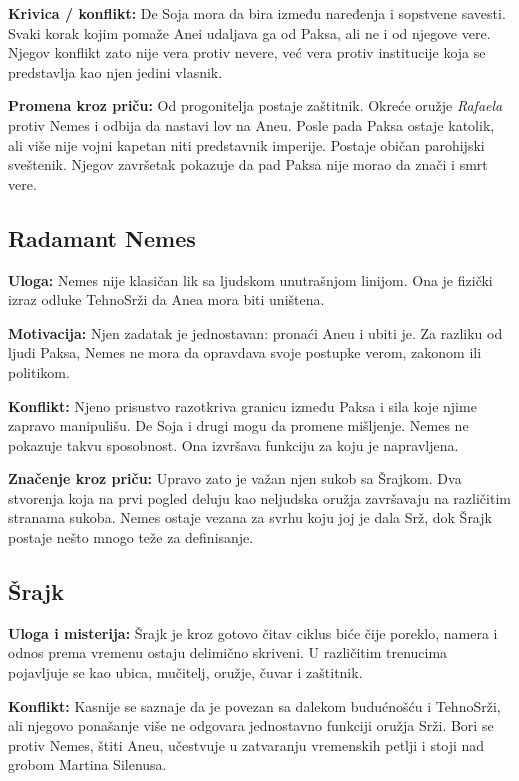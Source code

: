 \textbf{Krivica / konflikt:} De Soja mora da bira između naređenja i sopstvene savesti. Svaki korak kojim pomaže Anei udaljava ga od Paksa, ali ne i od njegove vere. Njegov konflikt zato nije vera protiv nevere, već vera protiv institucije koja se predstavlja kao njen jedini vlasnik.

\textbf{Promena kroz priču:} Od progonitelja postaje zaštitnik. Okreće oružje \emph{Rafaela} protiv Nemes i odbija da nastavi lov na Aneu. Posle pada Paksa ostaje katolik, ali više nije vojni kapetan niti predstavnik imperije. Postaje običan parohijski sveštenik. Njegov završetak pokazuje da pad Paksa nije morao da znači i smrt vere.


\subsection*{Radamant Nemes}

\textbf{Uloga:} Nemes nije klasičan lik sa ljudskom unutrašnjom linijom. Ona je fizički izraz odluke TehnoSrži da Anea mora biti uništena.

\textbf{Motivacija:} Njen zadatak je jednostavan: pronaći Aneu i ubiti je. Za razliku od ljudi Paksa, Nemes ne mora da opravdava svoje postupke verom, zakonom ili politikom.

\textbf{Konflikt:} Njeno prisustvo razotkriva granicu između Paksa i sila koje njime zapravo manipulišu. De Soja i drugi mogu da promene mišljenje. Nemes ne pokazuje takvu sposobnost. Ona izvršava funkciju za koju je napravljena.

\textbf{Značenje kroz priču:} Upravo zato je važan njen sukob sa Šrajkom. Dva stvorenja koja na prvi pogled deluju kao neljudska oružja završavaju na različitim stranama sukoba. Nemes ostaje vezana za svrhu koju joj je dala Srž, dok Šrajk postaje nešto mnogo teže za definisanje.


\subsection*{Šrajk}

\textbf{Uloga i misterija:} Šrajk je kroz gotovo čitav ciklus biće čije poreklo, namera i odnos prema vremenu ostaju delimično skriveni. U različitim trenucima pojavljuje se kao ubica, mučitelj, oružje, čuvar i zaštitnik.

\textbf{Konflikt:} Kasnije se saznaje da je povezan sa dalekom budućnošću i TehnoSrži, ali njegovo ponašanje više ne odgovara jednostavno funkciji oružja Srži. Bori se protiv Nemes, štiti Aneu, učestvuje u zatvaranju vremenskih petlji i stoji nad grobom Martina Silenusa.

